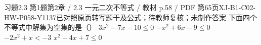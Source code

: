 \par\noindent\begin{minipage}{\linewidth}
\begin{bankitem}{习题2.3 第1题}{第2章 / 2.3 一元二次不等式 / 教材 p.58 / PDF 第65页}{XJ-B1-C02-HW-P058-Y1137}{已对照原页转写题干及公式；待教师复核；未制作答案}
下面四个不等式中解集为空集的是（\quad）
$3x^2-7x-10\le0$
$-x^2+6x-9\le0$
$-2x^2+x<-3$
$x^2-4x+7\le0$
\end{bankitem}
\end{minipage}\par\medskip
